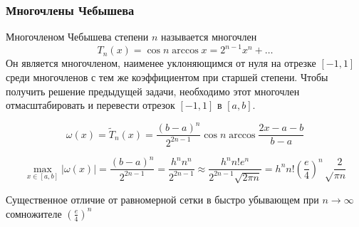 \documentclass[aspectratio=43,unicode]{beamer}
\begin{document}
\begin{frame}
\frametitle{Многочлены Чебышева}
	Многочленом Чебышева степени $n$ называется многочлен
	\[
	T_n(x) = \cos n \arccos x = 2^{n-1} x^n + \dots
	\]
	Он является многочленом, наименее уклоняющимся от нуля на отрезке $[-1,1]$ среди
	многочленов с тем же коэффициентом при старшей степени.
	Чтобы получить решение предыдущей задачи, необходимо этот многочлен отмасштабировать
	и перевести отрезок $[-1,1]$ в $[a,b]$.
	\pause

	\[
	\omega(x) = \widetilde{T}_n(x) = \frac{(b-a)^n}{2^{2n-1}} \cos n \arccos \frac{2x-a-b}{b-a}
	\]

	\pause
	$$
	\max_{x\in[a,b]} |\omega(x)| = \frac{(b-a)^n}{2^{2n-1}} =
	\frac{h^n n^n}{2^{2n-1}} \approx \frac{h^n n! e^n}{2^{2n-1}\sqrt{2\pi n}} =
	h^n n! \left(\frac{e}{4}\right)^n \sqrt\frac{2}{\pi n}
	$$

	Существенное отличие от равномерной сетки в быстро убывающем при $n
	\rightarrow \infty$ сомножителе $\left(\frac{e}{4}\right)^n$
\end{frame}
\end{document}
